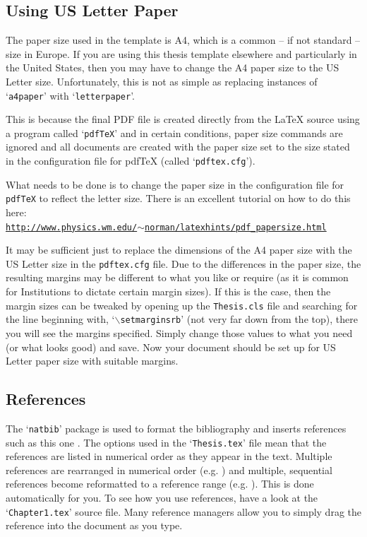 \subsection{Using US Letter Paper}

The paper size used in the template is A4, which is a common -- if not standard -- size in Europe. If you are using this thesis template elsewhere and particularly in the United States, then you may have to change the A4 paper size to the US Letter size. Unfortunately, this is not as simple as replacing instances of `\texttt{a4paper}' with `\texttt{letterpaper}'.

This is because the final PDF file is created directly from the \LaTeX{} source using a program called `\texttt{pdfTeX}' and in certain conditions, paper size commands are ignored and all documents are created with the paper size set to the size stated in the configuration file for pdfTeX (called `\texttt{pdftex.cfg}').

What needs to be done is to change the paper size in the configuration file for \texttt{pdfTeX} to reflect the letter size. There is an excellent tutorial on how to do this here: \\
\href{http://www.physics.wm.edu/~norman/latexhints/pdf_papersize.html}{\texttt{http://www.physics.wm.edu/$\sim$norman/latexhints/pdf\_papersize.html}}

It may be sufficient just to replace the dimensions of the A4 paper size with the US Letter size in the \texttt{pdftex.cfg} file. Due to the differences in the paper size, the resulting margins may be different to what you like or require (as it is common for Institutions to dictate certain margin sizes). If this is the case, then the margin sizes can be tweaked by opening up the \texttt{Thesis.cls} file and searching for the line beginning with, `$\backslash$\texttt{setmarginsrb}' (not very far down from the top), there you will see the margins specified. Simply change those values to what you need (or what looks good) and save. Now your document should be set up for US Letter paper size with suitable margins.

\subsection{References}

The `\texttt{natbib}' package is used to format the bibliography and inserts references such as this one \citep{Reference3}. The options used in the `\texttt{Thesis.tex}' file mean that the references are listed in numerical order as they appear in the text. Multiple references are rearranged in numerical order (e.g. \citep{Reference2, Reference1}) and multiple, sequential references become reformatted to a reference range (e.g. \citep{Reference2, Reference1, Reference3}). This is done automatically for you. To see how you use references, have a look at the `\texttt{Chapter1.tex}' source file. Many reference managers allow you to simply drag the reference into the document as you type.

